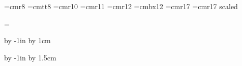 













\vsize=297mm
\hsize=210mm




\nopagenumbers


\parindent=0pt

\def\epsfsize#1#2{#1}

\font\small=cmr8
\font\smalltt=cmtt8
\font\medium=cmr10
\font\largemed=cmr11
\font\large=cmr12
\font\largebx=cmbx12
\font\Large=cmr17
\font\huge=cmr17 scaled 


\headline={\hfil}

\advance\voffset by -1in
\advance\voffset by 1cm

\advance\hoffset by -1in
\advance\hoffset by 1.5cm

